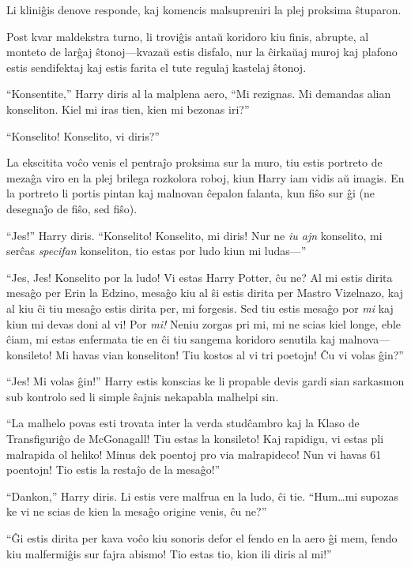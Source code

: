 Li kliniĝis denove responde, kaj komencis malsupreniri la plej
proksima ŝtuparon. 

Post kvar maldekstra turno, li troviĝis antaŭ koridoro kiu finis,
abrupte, al monteto de larĝaj ŝtonoj—kvazaŭ estis disfalo, nur la
ĉirkaŭaj muroj kaj plafono estis sendifektaj kaj estis farita el tute
regulaj kastelaj ŝtonoj.


``Konsentite,'' Harry diris al la malplena aero, ``Mi rezignas. Mi
demandas alian konseliton. Kiel mi iras tien, kien mi bezonas iri?''

``Konselito! Konselito, vi diris?''

La ekscitita voĉo venis el pentraĵo proksima sur la muro, tiu estis
portreto de mezaĝa viro en la plej brilega rozkolora roboj, kiun Harry
iam vidis aŭ imagis. En la portreto li portis pintan kaj malnovan
ĉepalon falanta, kun fiŝo sur ĝi (ne desegnaĵo de fiŝo, sed fiŝo).

``Jes!'' Harry diris. ``Konselito! Konselito, mi diris! Nur ne
\emph{iu ajn} konselito, mi serĉas \emph{specifan} konseliton, tio
estas por ludo kiun mi ludas—''

``Jes, Jes! Konselito por la ludo! Vi estas Harry Potter, ĉu ne?  Al
mi estis dirita mesaĝo per Erin la Edzino, mesaĝo kiu al ŝi estis
dirita per Mastro Vizelnazo, kaj al kiu ĉi tiu mesaĝo estis dirita
per, mi forgesis. Sed tiu estis mesaĝo por \emph{mi} kaj kiun mi devas
doni al vi! Por \emph{mi!} Neniu zorgas pri mi, mi ne scias kiel
longe, eble ĉiam, mi estas enfermata tie en ĉi tiu sangema koridoro
senutila kaj malnova—konsileto! Mi havas vian konseliton! Tiu kostos
al vi tri poetojn! Ĉu vi volas ĝin?''  

``Jes! Mi volas ĝin!'' Harry estis konscias ke li propable devis gardi
sian sarkasmon sub kontrolo sed li simple ŝajnis nekapabla malhelpi
sin.


``La malhelo povas esti trovata inter la verda studĉambro kaj la
Klaso de Transfiguriĝo de McGonagall! Tiu estas la konsileto! Kaj
rapidigu, vi estas pli malrapida ol heliko! Minus dek poentoj pro
via malrapideco! Nun vi havas 61 poentojn! Tio estis la restaĵo de la
mesaĝo!''

``Dankon,'' Harry diris. Li estis vere malfrua en la ludo, ĉi
tie. ``Hum\ldots mi supozas ke vi ne scias de kien la mesaĝo origine
venis, ĉu ne?'' 

``Ĝi estis dirita per kava voĉo kiu sonoris defor el fendo en la aero
ĝi mem, fendo kiu malfermiĝis sur fajra abismo! Tio estas tio, kion ili
diris al mi!''

